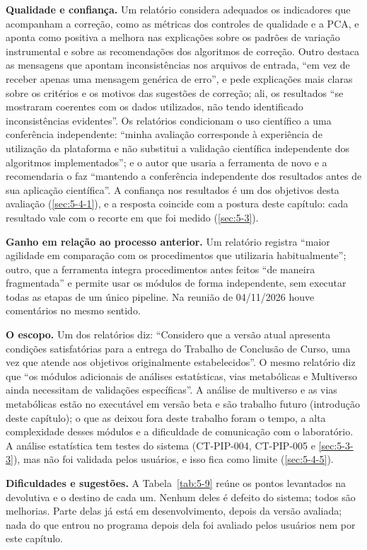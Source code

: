 \textbf{Qualidade e confiança.} Um relatório considera adequados os indicadores que acompanham a correção, como as métricas dos controles de qualidade e a PCA, e aponta como positiva a melhora nas explicações sobre os padrões de variação instrumental e sobre as recomendações dos algoritmos de correção. Outro destaca as mensagens que apontam inconsistências nos arquivos de entrada, ``em vez de receber apenas uma mensagem genérica de erro'', e pede explicações mais claras sobre os critérios e os motivos das sugestões de correção; ali, os resultados ``se mostraram coerentes com os dados utilizados, não tendo identificado inconsistências evidentes''. Os relatórios condicionam o uso científico a uma conferência independente: ``minha avaliação corresponde à experiência de utilização da plataforma e não substitui a validação científica independente dos algoritmos implementados''; e o autor que usaria a ferramenta de novo e a recomendaria o faz ``mantendo a conferência independente dos resultados antes de sua aplicação científica''. A confiança nos resultados é um dos objetivos desta avaliação (\ref{sec:5-4-1}), e a resposta coincide com a postura deste capítulo: cada resultado vale com o recorte em que foi medido (\ref{sec:5-3}).

\textbf{Ganho em relação ao processo anterior.} Um relatório registra ``maior agilidade em comparação com os procedimentos que utilizaria habitualmente''; outro, que a ferramenta integra procedimentos antes feitos ``de maneira fragmentada'' e permite usar os módulos de forma independente, sem executar todas as etapas de um único pipeline. Na reunião de 04/11/2026 houve comentários no mesmo sentido.

\textbf{O escopo.} Um dos relatórios diz: ``Considero que a versão atual apresenta condições satisfatórias para a entrega do Trabalho de Conclusão de Curso, uma vez que atende aos objetivos originalmente estabelecidos''. O mesmo relatório diz que ``os módulos adicionais de análises estatísticas, vias metabólicas e Multiverso ainda necessitam de validações específicas''. A análise de multiverso e as vias metabólicas estão no executável em versão beta e são trabalho futuro (introdução deste capítulo); o que as deixou fora deste trabalho foram o tempo, a alta complexidade desses módulos e a dificuldade de comunicação com o laboratório. A análise estatística tem testes do sistema (CT-PIP-004, CT-PIP-005 e \ref{sec:5-3-3}), mas não foi validada pelos usuários, e isso fica como limite (\ref{sec:5-4-5}).

\textbf{Dificuldades e sugestões.} A Tabela~\ref{tab:5-9} reúne os pontos levantados na devolutiva e o destino de cada um. Nenhum deles é defeito do sistema; todos são melhorias. Parte delas já está em desenvolvimento, depois da versão avaliada; nada do que entrou no programa depois dela foi avaliado pelos usuários nem por este capítulo.

